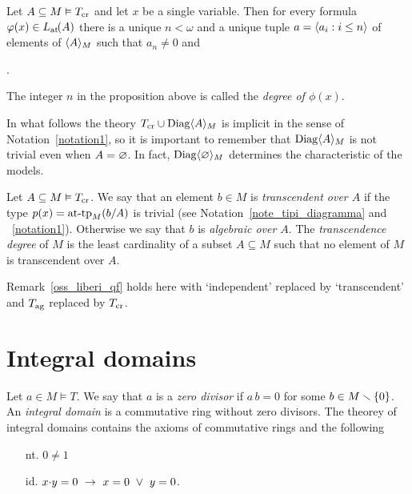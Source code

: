 \documentclass[creche.tex]{subfiles}
\begin{document}
\begin{proposition}
\label{prop_formacanonicaterminiau}
Let  $A\subseteq M\models T_{\rm cr}$ and let $x$ be a single variable. Then for every formula $\phi(x)\in \atL(A)$ there is a unique $n<\omega$ and a unique tuple $a=\<a_i:i\le n\>$ of elements of $\<A\>_M$ such that $a_n\neq0$ and 

.\QED
\end{proposition}

The integer $n$ in the proposition above is called the \emph{degree of $\phi(x)$}.

In what follows the theory $T_{\rm cr}\cup\Diag\<A\>_M$ is implicit in the sense of Notation~\ref{notation1}, so it is important to remember that $\Diag\<A\>_M$ is not trivial even when $A=\0$. In fact, $\Diag\<\0\>_M$ determines the characteristic of the models.



\begin{definition} Let $A\subseteq M\models T_{\rm cr}$. We say that an element $b\in M$ is \emph{transcendent over $A$\/} if the type $p(x)=\attp_M(b/A)$ is trivial (see Notation~\ref{note_tipi_diagramma} and ~\ref{notation1}). Otherwise we say that $b$ is \emph{algebraic over $A$}. The \emph{transcendence degree\/} of $M$ is the least cardinality of a subset $A\subseteq M$ such that no element of $M$ is transcendent over $A$.\QED
\end{definition}  


\begin{remark}\label{oss_liberi_cr}
Remark~\ref{oss_liberi_qf} holds here with `independent' replaced by `transcendent' and $T_{\rm ag}$ replaced by $T_{\rm cr}$.\QED
\end{remark}

\section{Integral domains}

Let $a\in M\models T$. We say that $a$ is a \emph{zero divisor} if $a\,b=0$ for some $b\in M\sm\{0\}$. An \emph{integral domain\/} is a commutative ring without zero divisors. The theorey of integral domains contains the axioms of commutative rings and the following
\begin{itemize}
\item[nt.] $0\neq 1$
\item[id.] $x\mdot y =0\ \imp\ x=0\ \vee\ y=0$.
\end{itemize}
\end{document}
